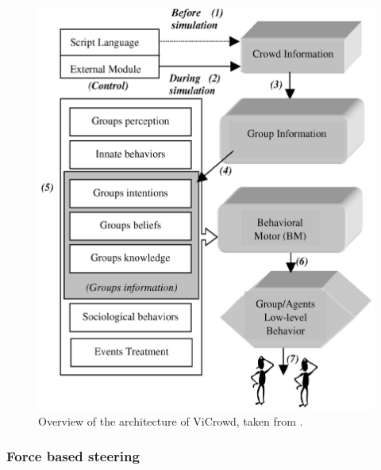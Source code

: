 \documentclass{acmsiggraph}               %
\begin{document}
\begin{figure}[h]
  \centering
  \includegraphics[width=1\linewidth]{images/HierarchicalArchitectureOverview.png}
  \caption{Overview of the architecture of ViCrowd, taken from \protect\cite{musse_hierarchical_2001}.}
  \label{fig:hierarchicalarchitectureOverview}
\end{figure}

\subsubsection{Force based steering}
\end{document}

